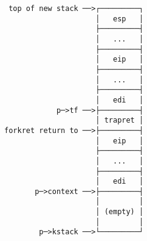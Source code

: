\documentclass[varwidth,crop]{standalone}
\begin{document}
\begin{verbatim}
 top of new stack ──>┌─────────┐
                     │   esp   │
                     ├─────────┤
                     │   ...   │
                     ├─────────┤
                     │   eip   │
                     ├─────────┤
                     │   ...   │
                     ├─────────┤
                     │   edi   │
            p─>tf ──>├─────────┤
                     │ trapret │
forkret return to ──>├─────────┤
                     │   eip   │
                     ├─────────┤
                     │   ...   │
                     ├─────────┤
                     │   edi   │
       p─>context ──>├─────────┤
                     │         │
                     │ (empty) │
                     │         │
        p─>kstack ──>└─────────┘
\end{verbatim}
\end{document}
